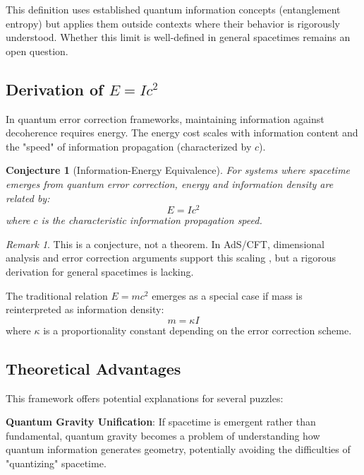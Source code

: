 \documentclass[12pt,twocolumn]{article}
\newtheorem{conjecture}[theorem]{Conjecture}
\theoremstyle{definition}
\theoremstyle{remark}
\newtheorem{remark}[theorem]{Remark}
\begin{document}
This definition uses established quantum information concepts (entanglement entropy) but applies them outside contexts where their behavior is rigorously understood. Whether this limit is well-defined in general spacetimes remains an open question.

\subsection{Derivation of $E = Ic^2$}

In quantum error correction frameworks, maintaining information against decoherence requires energy. The energy cost scales with information content and the "speed" of information propagation (characterized by $c$).

\begin{conjecture}[Information-Energy Equivalence]
For systems where spacetime emerges from quantum error correction, energy and information density are related by:
\begin{equation}
E = Ic^2
\label{eq:fundamental}
\end{equation}
where $c$ is the characteristic information propagation speed.
\end{conjecture}

\begin{remark}
This is a conjecture, not a theorem. In AdS/CFT, dimensional analysis and error correction arguments support this scaling \cite{Susskind2013}, but a rigorous derivation for general spacetimes is lacking.
\end{remark}

The traditional relation $E = mc^2$ emerges as a special case if mass is reinterpreted as information density:
\begin{equation}
m = \kappa I
\end{equation}
where $\kappa$ is a proportionality constant depending on the error correction scheme.

\subsection{Theoretical Advantages}

This framework offers potential explanations for several puzzles:

\textbf{Quantum Gravity Unification}: If spacetime is emergent rather than fundamental, quantum gravity becomes a problem of understanding how quantum information generates geometry, potentially avoiding the difficulties of "quantizing" spacetime.
\end{document}
